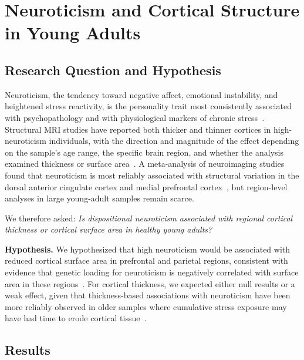 
\section{Neuroticism and Cortical Structure in Young Adults}
\label{sec:rq3}

\subsection{Research Question and Hypothesis}

Neuroticism, the tendency toward negative affect, emotional instability, and heightened stress reactivity, is the personality trait most consistently associated with psychopathology and with physiological markers of chronic stress~\cite{costa1992neo, servaas2015neuroticism}.
Structural MRI studies have reported both thicker and thinner cortices in high-neuroticism individuals, with the direction and magnitude of the effect depending on the sample's age range, the specific brain region, and whether the analysis examined thickness or surface area~\cite{bjornebekk2013neuronal, riccelli2017surface, jackson2011cortical}.
A meta-analysis of neuroimaging studies found that neuroticism is most reliably associated with structural variation in the dorsal anterior cingulate cortex and medial prefrontal cortex~\cite{servaas2015neuroticism}, but region-level analyses in large young-adult samples remain scarce.

We therefore asked: \textit{Is dispositional neuroticism associated with regional cortical thickness or cortical surface area in healthy young adults?}

\textbf{Hypothesis.}
We hypothesized that high neuroticism would be associated with reduced cortical surface area in prefrontal and parietal regions, consistent with evidence that genetic loading for neuroticism is negatively correlated with surface area in these regions~\cite{riccelli2017surface}.
For cortical thickness, we expected either null results or a weak effect, given that thickness-based associations with neuroticism have been more reliably observed in older samples where cumulative stress exposure may have had time to erode cortical tissue~\cite{jackson2011cortical, lupien2009effects}.

\subsection{Results}


